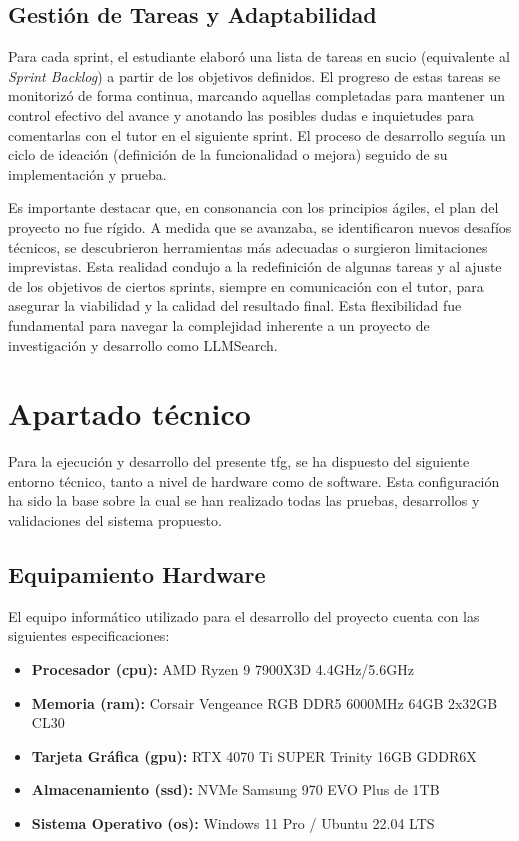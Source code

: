 \subsection{Gestión de Tareas y Adaptabilidad}
\label{subsec:gestion_tareas}

Para cada sprint, el estudiante elaboró una lista de tareas en sucio (equivalente al \textit{Sprint Backlog}) a partir de los objetivos definidos. El progreso de estas tareas se monitorizó de forma continua, marcando aquellas completadas para mantener un control efectivo del avance y anotando las posibles dudas e inquietudes para comentarlas con el tutor en el siguiente sprint. El proceso de desarrollo seguía un ciclo de ideación (definición de la funcionalidad o mejora) seguido de su implementación y prueba.

Es importante destacar que, en consonancia con los principios ágiles, el plan del proyecto no fue rígido. A medida que se avanzaba, se identificaron nuevos desafíos técnicos, se descubrieron herramientas más adecuadas o surgieron limitaciones imprevistas. Esta realidad condujo a la redefinición de algunas tareas y al ajuste de los objetivos de ciertos sprints, siempre en comunicación con el tutor, para asegurar la viabilidad y la calidad del resultado final. Esta flexibilidad fue fundamental para navegar la complejidad inherente a un proyecto de investigación y desarrollo como LLMSearch.

\section{Apartado técnico}
\label{sec:apartado_tecnico}

Para la ejecución y desarrollo del presente \gls{tfg}, se ha dispuesto del siguiente entorno técnico, tanto a nivel de hardware como de software. Esta configuración ha sido la base sobre la cual se han realizado todas las pruebas, desarrollos y validaciones del sistema propuesto.

\subsection{Equipamiento Hardware}
El equipo informático utilizado para el desarrollo del proyecto cuenta con las siguientes especificaciones:
\begin{itemize}
    \item \textbf{Procesador (\gls{cpu}):} AMD Ryzen 9 7900X3D 4.4GHz/5.6GHz
    \item \textbf{Memoria (\gls{ram}):} Corsair Vengeance RGB DDR5 6000MHz 64GB 2x32GB CL30
    \item \textbf{Tarjeta Gráfica (\gls{gpu}):} RTX 4070 Ti SUPER Trinity 16GB GDDR6X
    \item \textbf{Almacenamiento (\gls{ssd}):} NVMe Samsung 970 EVO Plus de 1TB
    \item \textbf{Sistema Operativo (\gls{os}):} Windows 11 Pro / Ubuntu 22.04 LTS
\end{itemize}

